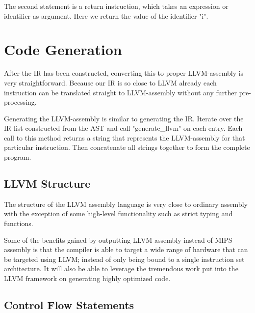 The second statement is a return instruction, which takes an expression or identifier as argument. Here we return the value of the identifier "i".

\section{Code Generation}

After the IR has been constructed, converting this to proper LLVM-assembly is very straightforward. Because our IR is so close to LLVM already each instruction can be translated straight to LLVM-assembly without any further pre-processing.

Generating the LLVM-assembly is similar to generating the IR. Iterate over the IR-list constructed from the AST and call "generate\_llvm" on each entry. Each call to this method returns a string that represents the LLVM-assembly for that particular instruction. Then concatenate all strings together to form the complete program.

\subsection{LLVM Structure}

The structure of the LLVM assembly language is very close to ordinary assembly with the exception of some high-level functionality such as strict typing and functions.


Some of the benefits gained by outputting LLVM-assembly instead of MIPS-assembly is that the compiler is able to target a wide range of hardware that can be targeted using LLVM; instead of only being bound to a single instruction set architecture. It will also be able to leverage the tremendous work put into the LLVM framework on generating highly optimized code.

\subsection{Control Flow Statements}



